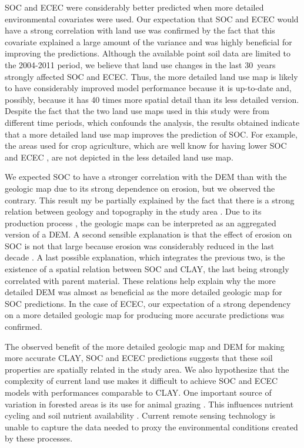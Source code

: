 SOC and ECEC were considerably better predicted when more detailed environmental covariates were used. Our 
expectation that SOC and ECEC would have a strong correlation with land use was confirmed by the fact that this 
covariate explained a large amount of the variance and was highly beneficial for improving the predictions. 
Although the available point soil data are limited to the 2004-2011 period, we believe that land use changes in 
the last 30~years \cite{MiguelEtAl2012, TenCatenEtAl2012b} strongly affected SOC and ECEC. Thus, 
the more detailed land use map is likely to have considerably improved model performance because it is 
up-to-date and, possibly, because it has 40 times more spatial detail than its less detailed version. Despite 
the fact that the two land use maps used in this study were from different time periods, which confounds the 
analysis, the results obtained indicate that a more detailed land use map improves the prediction of SOC. For 
example, the areas used for crop agriculture, which are well know for having lower SOC and ECEC 
\cite{Menezes2008, MouraBueno2012}, are not depicted in the less detailed land use map.

We expected SOC to have a stronger correlation with the DEM than with the geologic map due to its strong 
dependence on erosion, but we observed the contrary. This result my be partially explained by the fact that 
there is a strong relation between geology and topography in the study area \cite{Sartori2009}. Due to its 
production process \cite{MacielFilho1990}, the geologic maps can be interpreted as an aggregated version of a 
DEM. A second sensible explanation is that the effect of erosion on SOC is not that large because erosion was 
considerably reduced in the last decade \cite{MiguelEtAl2012, TenCatenEtAl2012b}. A last possible explanation, 
which integrates the previous two, is the existence of a spatial relation between SOC and CLAY, the last being 
strongly correlated with parent material. These relations help explain why the more detailed DEM was almost as 
beneficial as the more detailed geologic map for SOC predictions. In the case of ECEC, our expectation of a 
strong dependency on a more detailed geologic map for producing more accurate predictions was confirmed.

The observed benefit of the more detailed geologic map and DEM for making more accurate CLAY, SOC and ECEC 
predictions suggests that these soil properties are spatially related in the study area. We also hypothesize 
that the complexity of current land use makes it difficult to achieve SOC and ECEC models with 
performances comparable to CLAY. One important source of variation in forested areas is its use for animal 
grazing \cite{SamuelRosaEtAl2011a}. This influences nutrient cycling and soil nutrient availability 
\cite{SchramaEtAl2013}. Current remote sensing technology is unable to capture the data needed to proxy the 
environmental conditions created by these processes.

